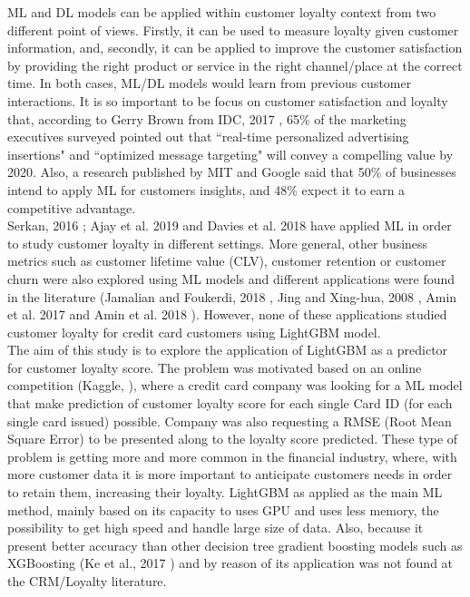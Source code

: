 \documentclass[letterpaper, 10 pt, conference]{ieeeconf}  %
\begin{document}
ML and DL models can be applied within customer loyalty context from two different point of views. Firstly, it can be used to measure loyalty given customer information, and, secondly, it can be applied to improve the customer satisfaction by providing the right product or service in the right channel/place at the correct time. In both cases, ML/DL models would learn from previous customer interactions. It is so important to be focus on customer satisfaction and loyalty that, according to Gerry Brown from IDC, 2017 \cite{IDC2017}, 65\% of the marketing executives surveyed pointed out that ``real-time personalized advertising insertions" and ``optimized message targeting" will convey a compelling value by 2020. Also, a research published by MIT and Google said that 50\% of businesses intend to apply ML for customers insights, and 48\% expect it to earn a competitive advantage. \\ 

Serkan, 2016 \cite{Loyal2016}; Ajay et al. 2019 \cite{loyal2019} and Davies et al. 2018 \cite{loyal2018} have applied ML in order to study customer loyalty in different settings. More general, other business metrics such as customer lifetime value (CLV), customer retention or customer churn were also explored using ML models and different applications were found in the literature (Jamalian and Foukerdi, 2018 \cite{Jamalian2018}, Jing and Xing-hua, 2008 \cite{Zhao2008}, Amin et al. 2017 \cite{Amin2018} and Amin et al. 2018 \cite{Amin2018}). However, none of these applications studied customer loyalty for credit card customers using LightGBM model.\\

The aim of this study is to explore the application of LightGBM as a predictor for customer loyalty score. The problem was motivated based on an online competition (Kaggle, \cite{Kaggle}), where a credit card company was looking for a ML model that make prediction of customer loyalty score for each single Card ID (for each single card issued) possible. Company was also requesting a RMSE (Root Mean Square Error) to be presented along to the loyalty score predicted. These type of problem is getting more and more common in the financial industry, where, with more customer data it is more important to anticipate customers needs in order to retain them, increasing their loyalty. LightGBM as applied as the main ML method, mainly based on its capacity to uses GPU and uses less memory, the possibility to get high speed and handle large size of data. Also, because it present better accuracy than other decision tree gradient boosting models such as XGBoosting (Ke et al., 2017 \cite{LGBM}) and by reason of its application was not found at the CRM/Loyalty literature.
\end{document}
